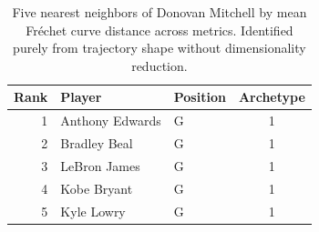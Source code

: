 \begin{table}[htbp]
  \centering\small
  \begin{tabular}{rllc}
    \toprule
    Rank & Player & Position & Archetype \\
    \midrule
    1 & Anthony Edwards & G & 1 \\
    2 & Bradley Beal & G & 1 \\
    3 & LeBron James & G & 1 \\
    4 & Kobe Bryant & G & 1 \\
    5 & Kyle Lowry & G & 1 \\
    \bottomrule
  \end{tabular}
  \caption{Five nearest neighbors of Donovan Mitchell by mean Fr\'{e}chet curve distance across metrics. Identified purely from trajectory shape without dimensionality reduction.}
  \label{tab:Donovan_Mitchell_frechet_curve_neighbors}
\end{table}

